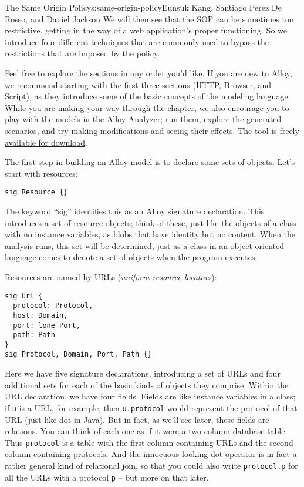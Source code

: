 \begin{aosachapter}{The Same Origin Policy}{s:same-origin-policy}{Eunsuk Kang, Santiago Perez De Rosso, and Daniel Jackson}
We will then see that the SOP can be sometimes too restrictive, getting
in the way of a web application's proper functioning. So we introduce
four different techniques that are commonly used to bypass the
restrictions that are imposed by the policy.

Feel free to explore the sections in any order you'd like. If you are
new to Alloy, we recommend starting with the first three sections (HTTP,
Browser, and Script), as they introduce some of the basic concepts of
the modeling language. While you are making your way through the
chapter, we also encourage you to play with the models in the Alloy
Analyzer; run them, explore the generated scenarios, and try making
modifications and seeing their effects. The tool is
\href{http://alloy.mit.edu}{freely available for download}.

\label{model-of-the-web}

\label{http-protocol}

The first step in building an Alloy model is to declare some sets of
objects. Let's start with resources:

\begin{verbatim}
sig Resource {}
\end{verbatim}

The keyword ``sig'' identifies this as an Alloy signature declaration.
This introduces a set of resource objects; think of these, just like the
objects of a class with no instance variables, as blobs that have
identity but no content. When the analysis runs, this set will be
determined, just as a class in an object-oriented language comes to
denote a set of objects when the program executes.

Resources are named by URLs (\emph{uniform resource locators}):

\begin{verbatim}
sig Url {
  protocol: Protocol,
  host: Domain,
  port: lone Port,
  path: Path
}
sig Protocol, Domain, Port, Path {}
\end{verbatim}

Here we have five signature declarations, introducing a set of URLs and
four additional sets for each of the basic kinds of objects they
comprise. Within the URL declaration, we have four fields. Fields are
like instance variables in a class; if \texttt{u} is a URL, for example,
then \texttt{u.protocol} would represent the protocol of that URL (just
like dot in Java). But in fact, as we'll see later, these fields are
relations. You can think of each one as if it were a two-column database
table. Thus \texttt{protocol} is a table with the first column
containing URLs and the second column containing protocols. And the
innocuous looking dot operator is in fact a rather general kind of
relational join, so that you could also write \texttt{protocol.p} for
all the URLs with a protocol \texttt{p} -- but more on that later.


\end{aosachapter}
